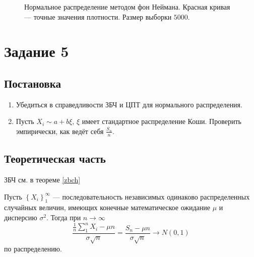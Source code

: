 \documentclass[12pt, a4paper]{article}
\begin{document}
\begin{figure}[H]
\begin{center}
\end{center}
\caption{Нормальное распределение методом фон Неймана. Красная кривая --- точные значения плотности. Размер выборки $5000$.}
\end{figure}

\newpage

\section{Задание 5}
\subsection{Постановка}
\begin{enumerate}
\item Убедиться в справедливости ЗБЧ и ЦПТ для нормального распределения.
\item Пусть $X_i \sim a+b\xi$, $\xi$ имеет стандартное распределение Коши. Проверить эмпирически, как ведёт себя $\frac{S_n}{n}$.
\end{enumerate}
\subsection{Теоретическая часть}
ЗБЧ см. в теореме \ref{zbch}

\begin{theorem}
Пусть $\left\{X_i\right\}_1^\infty$ --- последовательность независимых одинаково распределенных случайных величин, имеющих конечные математическое ожидание $\mu$ и дисперсию $\sigma^2$. Тогда при $n\to\infty$
\[ \frac{\frac{1}{n} \sum\limits_1^n X_i - \mu n}{\sigma \sqrt{n}} = \frac{S_n - \mu n}{\sigma \sqrt{n}} \to N(0,1)\]
по распределению.
\end{theorem}
\end{document}
